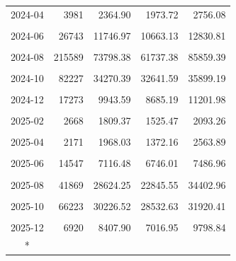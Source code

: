\begin{longtable}[t]{crrrr}
2024-04 & 3981 & 2364.90 & 1973.72 & 2756.08\\
\cellcolor{gray!10}{2024-05} & \cellcolor{gray!10}{10976} & \cellcolor{gray!10}{5613.20} & \cellcolor{gray!10}{5161.39} & \cellcolor{gray!10}{6065.01}\\
2024-06 & 26743 & 11746.97 & 10663.13 & 12830.81\\
\cellcolor{gray!10}{2024-07} & \cellcolor{gray!10}{18231} & \cellcolor{gray!10}{12371.37} & \cellcolor{gray!10}{9811.49} & \cellcolor{gray!10}{14931.25}\\
2024-08 & 215589 & 73798.38 & 61737.38 & 85859.39\\
\cellcolor{gray!10}{2024-09} & \cellcolor{gray!10}{272041} & \cellcolor{gray!10}{87198.65} & \cellcolor{gray!10}{81507.17} & \cellcolor{gray!10}{92890.13}\\
2024-10 & 82227 & 34270.39 & 32641.59 & 35899.19\\
\cellcolor{gray!10}{2024-11} & \cellcolor{gray!10}{46560} & \cellcolor{gray!10}{21470.82} & \cellcolor{gray!10}{19822.23} & \cellcolor{gray!10}{23119.41}\\
2024-12 & 17273 & 9943.59 & 8685.19 & 11201.98\\
\cellcolor{gray!10}{2025-01} & \cellcolor{gray!10}{3423} & \cellcolor{gray!10}{2881.95} & \cellcolor{gray!10}{2497.02} & \cellcolor{gray!10}{3266.89}\\
2025-02 & 2668 & 1809.37 & 1525.47 & 2093.26\\
\cellcolor{gray!10}{2025-03} & \cellcolor{gray!10}{3435} & \cellcolor{gray!10}{2292.14} & \cellcolor{gray!10}{1992.19} & \cellcolor{gray!10}{2592.08}\\
2025-04 & 2171 & 1968.03 & 1372.16 & 2563.89\\
\cellcolor{gray!10}{2025-05} & \cellcolor{gray!10}{8928} & \cellcolor{gray!10}{4668.20} & \cellcolor{gray!10}{4350.93} & \cellcolor{gray!10}{4985.46}\\
2025-06 & 14547 & 7116.48 & 6746.01 & 7486.96\\
\cellcolor{gray!10}{2025-07} & \cellcolor{gray!10}{17170} & \cellcolor{gray!10}{11865.41} & \cellcolor{gray!10}{8995.05} & \cellcolor{gray!10}{14735.77}\\
2025-08 & 41869 & 28624.25 & 22845.55 & 34402.96\\
\cellcolor{gray!10}{2025-09} & \cellcolor{gray!10}{62690} & \cellcolor{gray!10}{36754.38} & \cellcolor{gray!10}{33288.71} & \cellcolor{gray!10}{40220.06}\\
2025-10 & 66223 & 30226.52 & 28532.63 & 31920.41\\
\cellcolor{gray!10}{2025-11} & \cellcolor{gray!10}{20907} & \cellcolor{gray!10}{16162.42} & \cellcolor{gray!10}{14620.57} & \cellcolor{gray!10}{17704.27}\\
2025-12 & 6920 & 8407.90 & 7016.95 & 9798.84\\*
\end{longtable}

